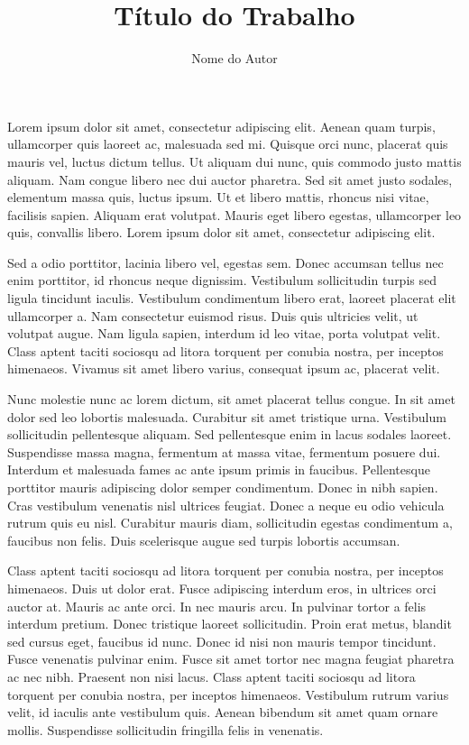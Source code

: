 \documentclass[doutorado,rascunho]{fei}
\author{Nome do Autor}
\title{Título do Trabalho}
\begin{document}
\maketitle

\folhaderosto

\fichacatalografica
\folhadeaprovacao
{}
\begin{agradecimentos}
Lorem ipsum dolor sit amet, consectetur adipiscing elit. Aenean quam turpis, ullamcorper quis laoreet ac, malesuada sed mi. Quisque orci nunc, placerat quis mauris vel, luctus dictum tellus. Ut aliquam dui nunc, quis commodo justo mattis aliquam. Nam congue libero nec dui auctor pharetra. Sed sit amet justo sodales, elementum massa quis, luctus ipsum. Ut et libero mattis, rhoncus nisi vitae, facilisis sapien. Aliquam erat volutpat. Mauris eget libero egestas, ullamcorper leo quis, convallis libero. Lorem ipsum dolor sit amet, consectetur adipiscing elit.

Sed a odio porttitor, lacinia libero vel, egestas sem. Donec accumsan tellus nec enim porttitor, id rhoncus neque dignissim. Vestibulum sollicitudin turpis sed ligula tincidunt iaculis. Vestibulum condimentum libero erat, laoreet placerat elit ullamcorper a. Nam consectetur euismod risus. Duis quis ultricies velit, ut volutpat augue. Nam ligula sapien, interdum id leo vitae, porta volutpat velit. Class aptent taciti sociosqu ad litora torquent per conubia nostra, per inceptos himenaeos. Vivamus sit amet libero varius, consequat ipsum ac, placerat velit.

Nunc molestie nunc ac lorem dictum, sit amet placerat tellus congue. In sit amet dolor sed leo lobortis malesuada. Curabitur sit amet tristique urna. Vestibulum sollicitudin pellentesque aliquam. Sed pellentesque enim in lacus sodales laoreet. Suspendisse massa magna, fermentum at massa vitae, fermentum posuere dui. Interdum et malesuada fames ac ante ipsum primis in faucibus. Pellentesque porttitor mauris adipiscing dolor semper condimentum. Donec in nibh sapien. Cras vestibulum venenatis nisl ultrices feugiat. Donec a neque eu odio vehicula rutrum quis eu nisl. Curabitur mauris diam, sollicitudin egestas condimentum a, faucibus non felis. Duis scelerisque augue sed turpis lobortis accumsan.

Class aptent taciti sociosqu ad litora torquent per conubia nostra, per inceptos himenaeos. Duis ut dolor erat. Fusce adipiscing interdum eros, in ultrices orci auctor at. Mauris ac ante orci. In nec mauris arcu. In pulvinar tortor a felis interdum pretium. Donec tristique laoreet sollicitudin. Proin erat metus, blandit sed cursus eget, faucibus id nunc. Donec id nisi non mauris tempor tincidunt. Fusce venenatis pulvinar enim. Fusce sit amet tortor nec magna feugiat pharetra ac nec nibh. Praesent non nisi lacus. Class aptent taciti sociosqu ad litora torquent per conubia nostra, per inceptos himenaeos. Vestibulum rutrum varius velit, id iaculis ante vestibulum quis. Aenean bibendum sit amet quam ornare mollis. Suspendisse sollicitudin fringilla felis in venenatis.


\end{agradecimentos}
\end{document}
